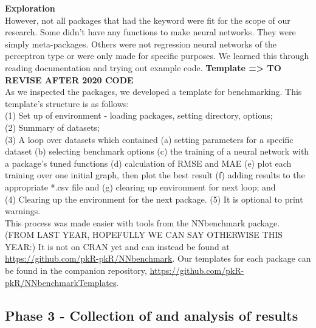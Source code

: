 \textbf{Exploration}\\
However, not all packages that had the keyword were fit for the scope of
our research. Some didn't have any functions to make neural networks.
They were simply meta-packages. Others were not regression neural
networks of the perceptron type or were only made for specific purposes.
We learned this through reading documentation and trying out example
code. \textbf{Template =\textgreater{} TO REVISE AFTER 2020 CODE}\\
As we inspected the packages, we developed a template for benchmarking.
This template's structure is as follows:\\
(1) Set up of environment - loading packages, setting directory,
options;\\
(2) Summary of datasets;\\
(3) A loop over datasets which contained (a) setting parameters for a
specific dataset (b) selecting benchmark options (c) the training of a
neural network with a package's tuned functions (d) calculation of RMSE
and MAE (e) plot each training over one initial graph, then plot the
best result (f) adding results to the appropriate *.csv file and (g)
clearing up environment for next loop; and\\
(4) Clearing up the environment for the next package. (5) It is optional
to print warnings.\\
This process was made easier with tools from the NNbenchmark package.
(FROM LAST YEAR, HOPEFULLY WE CAN SAY OTHERWISE THIS YEAR:) It is not on
CRAN yet and can instead be found at
\url{https://github.com/pkR-pkR/NNbenchmark}. Our templates for each
package can be found in the companion repository,
\url{https://github.com/pkR-pkR/NNbenchmarkTemplates}.

\hypertarget{phase-3---collection-of-and-analysis-of-results}{%
\subsection{Phase 3 - Collection of and analysis of
results}\label{phase-3---collection-of-and-analysis-of-results}}


